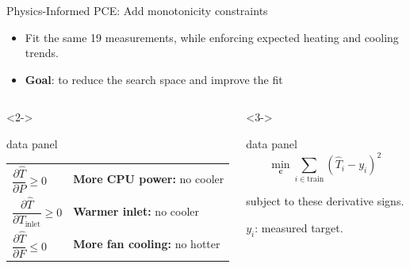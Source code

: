\begin{frame}{Physics-Informed PCE: Add monotonicity constraints}
  \vspace*{2mm}
  \small
  \begin{itemize}
    \item Fit the same 19 measurements, while enforcing expected heating and cooling trends.
    \item \textbf{Goal}: to reduce the search space and improve the fit
  \end{itemize}
  \par\vfill
  \begin{columns}[T,onlytextwidth]
      \begin{uncoverenv}<2->
      \begin{beamercolorbox}[sep=2.5mm,wd=\linewidth]{data panel}
        \small
        \renewcommand{\arraystretch}{1.8}
        \begin{tabular}{@{}ll@{}}
          $\dfrac{\partial\widehat T}{\partial P}\geq0$ & \textbf{More CPU power:} no cooler\\ \vspace{1.2mm}
          $\dfrac{\partial\widehat T}{\partial T_{\mathrm{inlet}}}\geq0$ & \textbf{Warmer inlet:} no cooler\\ \vspace{1.2mm}
          $\dfrac{\partial\widehat T}{\partial F}\leq0$ & \textbf{More fan cooling:} no hotter
        \end{tabular}
      \end{beamercolorbox}
      \end{uncoverenv}
      \begin{uncoverenv}<3->
      \begin{beamercolorbox}[sep=2.5mm,wd=\linewidth]{data panel}
        \[
          \min_{\mathbf c}\sum_{i\in\mathrm{train}}(\widehat T_i-y_i)^2
        \]
        {\small\centering subject to these derivative signs.\par}
        \medskip
        {\footnotesize\color{black!60}$y_i$: measured target.\par}
      \end{beamercolorbox}
      \end{uncoverenv}
  \end{columns}
  \par\vfill

\end{frame}
